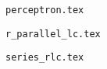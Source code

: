 \documentclass{article}
\begin{document}
\begin{figure}
  \centering
  
  \caption{\texttt{perceptron.tex}}
\end{figure}

\begin{figure}
  \centering
  
  \caption{\texttt{r\_parallel\_lc.tex}}
\end{figure}

\begin{figure}
  \centering
  
  \caption{\texttt{series\_rlc.tex}}
\end{figure}
\end{document}
